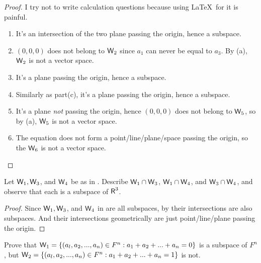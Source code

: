 \begin{proof}
I try not to write calculation questions because using \LaTeX\ for it is painful.

\begin{enumerate}
    \item It's an intersection of the two plane passing the origin, hence a subspace.
    \item \((0, 0, 0)\) does not belong to \(\textsf{W}_2\) since \(a_1\) can never be equal to \(a_3\).
          By (a), \(\textsf{W}_2\) is not a vector space.
    \item It's a plane passing the origin, hence a subspace.
    \item Similarly as part(c), it's a plane passing the origin, hence a subspace.
    \item It's a plane \emph{not} passing the origin, hence \((0, 0, 0)\) does not belong to \(\textsf{W}_5\), so by (a), \(\textsf{W}_5\) is not a vector space.
    \item The equation does not form a point/line/plane/space passing the origin, so the \(\textsf{W}_6\) is not a vector space.
\end{enumerate}
\end{proof}

\begin{exercise} \label{exercise 1.3.9}
Let \(\textsf{W}_1, \textsf{W}_3\), and \(\textsf{W}_4\) be as in .
Describe \(\textsf{W}_1 \cap \textsf{W}_3\), \(\textsf{W}_1 \cap \textsf{W}_4\), and \(\textsf{W}_3 \cap \textsf{W}_4\), and observe that each is a subspace of \(\textsf{R}^3\).
\end{exercise}

\begin{proof}
Since \(\textsf{W}_1, \textsf{W}_3\), and \(\textsf{W}_4\) in  are all subspaces, by  their intersections are also subspaces.
And their intersections geometrically are just point/line/plane passing the origin.
\end{proof}

\begin{exercise} \label{exercise 1.3.10}
Prove that \(\textsf{W}_1 = \{ (a_l, a_2, ..., a_n) \in F^n: a_1 + a_2 + ... + a_n = 0 \} \) is a subspace of \(F^n\), but \(\textsf{W}_2 = \{ (a_l, a_2, ..., a_n) \in F^n : a_1 + a_2 + ... + a_n = 1\} \)
is not.
\end{exercise}

